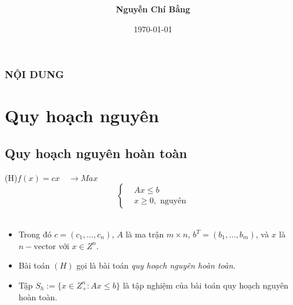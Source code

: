 \documentclass{beamer}
\begin{document}
\title[]{\fontsize{13pt}{10pt}\selectfont {\bf \LARGE Phương pháp nhánh cận}\\}
\author[]{\bf Nguyễn Chí Bằng \\}
\small{\date{\today}}
\begin{frame}
\begin{center}
\end{center}
\titlepage
\end{frame}

\begin{frame}
    \frametitle{NỘI DUNG}
    \tableofcontents
\end{frame}

\section{Quy hoạch nguyên}
\subsection{Quy hoạch nguyên hoàn toàn}
\begin{frame}
    \begin{center}                    
        \big(H\big)\quad $f(x)=cx \quad \longrightarrow Max$ \\
        \[\left\{\begin{aligned}
            &Ax \leq  b \\
            &x\geq 0, \text{ nguyên}
        \end{aligned}\right.\]\\
    \end{center}
    \begin{itemize}
    \item Trong đó $c=(c_1,\ldots,c_n)$, $A$ là ma trận $m\times n$, $b^T=(b_1,\ldots,b_m)$, và $x$ là $n-\text{vector}$ với $x\in Z^n$.
    \item Bài toán $(H)$ gọi là bài toán \textit{quy hoạch nguyên hoàn toàn.}
    \item Tập $S_h:=\{x\in Z^n_+: Ax\leq b\}$ là tập nghiệm của bài toán quy hoạch nguyên hoàn toàn.
    \end{itemize}
\end{frame}
\end{document}
